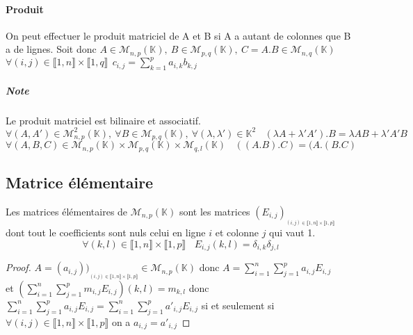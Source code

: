 	 	\paragraph{Produit}
	 	 	On peut effectuer le produit matriciel de A et B si A a autant de colonnes 
	 	 	que B a de lignes. Soit donc
	 	 	$ A \in \mathcal{M}_{n,p} (\mathbb{K} ), ~B \in \mathcal{M}_{p,q} (\mathbb{K} ), 
	 	 	~C = A.B \in \mathcal{M}_{n,q} (\mathbb{K} ) $\\ \hspace*{2.5cm}
	 	 	$\forall (i,j) \in \llbracket 1,n\rrbracket \times \llbracket 1,q\rrbracket ~~
	 	 	c_{i,j} = \sum\limits_{k=1}^{p} a_{i,k} b_{k,j} $ \trait
	 	\subparagraph{Note}
	 	 	 Le produit matriciel est bilinaire et associatif.
	 	 	 \[ \forall (A,A') \in\mathcal{M}_{n,p}^2 (\mathbb{K} ),~\forall 
	 	 	 B\in\mathcal{M}_{p,q} (\mathbb{K} ),~\forall (\lambda ,\lambda ')
	 	 	 \in\mathbb{K}^2 ~~~~ (\lambda A + \lambda 'A').B = \lambda AB + \lambda 'A'B\]
	 	 	 \[\forall (A,B,C) \in \mathcal{M}_{n,p} (\mathbb{K} ) \times 
	 	 	 \mathcal{M}_{p,q} (\mathbb{K} ) \times \mathcal{M}_{q,l} (\mathbb{K} )~~~~ 
	 	 	 ((A.B).C) = (A.(B.C)\]
	\subsection{Matrice élémentaire}
		Les matrices élémentaires de $\mathcal{M}_{n,p} (\mathbb{K} )$ sont les matrices 
		$(E_{i,j})_{_{(i,j)\in\llbracket 1,n\rrbracket \times \llbracket 1,p \rrbracket }}$ 
		dont tout le coefficients sont nuls celui en ligne $i$ et colonne $j$ qui vaut 1.
		 \[ \forall (k,l)\in \llbracket 1,n \rrbracket \times \llbracket 1,p \rrbracket ~~~~
		E_{i,j} (k,l) = \delta_{i,k} \delta_{j,l} \]
		\begin{proof}
		$A = (a_{i,j}))_{_{(i,j)\in\llbracket 1,n\rrbracket \times 
		\llbracket 1,p \rrbracket }} \in\mathcal{M}_{n,p} (\mathbb{K} )$
		donc $A = \sum\limits_{i=1}^n \sum\limits_{j=1}^p a_{i,j} E_{i,j}$ \\
		et $(\sum\limits_{i=1}^n \sum\limits_{j=1}^p m_{i,j} E_{i,j} )(k,l) = m_{k,l}$
		donc $\sum\limits_{i=1}^n \sum\limits_{j=1}^p a_{i,j} E_{i,j} = 
		\sum\limits_{i=1}^n \sum\limits_{j=1}^p a'_{i,j} E_{i,j}$
		si et seulement si $\forall (i,j)\in\llbracket 1,n\rrbracket \times 
		\llbracket 1,p \rrbracket $ on a $a_{i,j} = a'_{i,j}$
		\end{proof} \newpage \traitd
